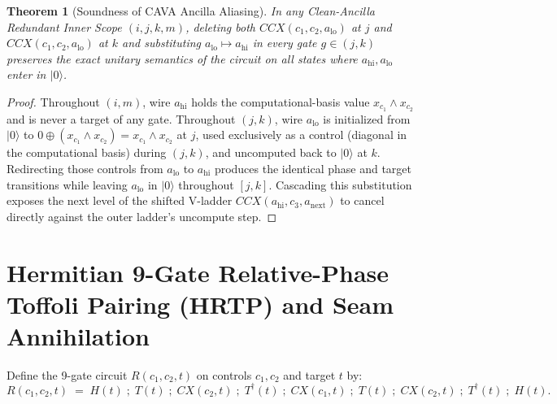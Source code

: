 \documentclass[11pt,a4paper]{article}
\newtheorem{theorem}{Theorem}[section]
\theoremstyle{definition}
\begin{document}
\begin{theorem}[Soundness of \textsc{CAVA} Ancilla Aliasing]
\label{thm:cava}
In any Clean-Ancilla Redundant Inner Scope $(i, j, k, m)$, deleting both $\mathit{CCX}(c_1, c_2, a_{\mathrm{lo}})$ at $j$ and $\mathit{CCX}(c_1, c_2, a_{\mathrm{lo}})$ at $k$ and substituting $a_{\mathrm{lo}} \mapsto a_{\mathrm{hi}}$ in every gate $g \in (j, k)$ preserves the exact unitary semantics of the circuit on all states where $a_{\mathrm{hi}}, a_{\mathrm{lo}}$ enter in $|0\rangle$.
\end{theorem}
\begin{proof}
Throughout $(i, m)$, wire $a_{\mathrm{hi}}$ holds the computational-basis value $x_{c_1} \land x_{c_2}$ and is never a target of any gate. Throughout $(j, k)$, wire $a_{\mathrm{lo}}$ is initialized from $|0\rangle$ to $0 \oplus (x_{c_1} \land x_{c_2}) = x_{c_1} \land x_{c_2}$ at $j$, used exclusively as a control (diagonal in the computational basis) during $(j, k)$, and uncomputed back to $|0\rangle$ at $k$. Redirecting those controls from $a_{\mathrm{lo}}$ to $a_{\mathrm{hi}}$ produces the identical phase and target transitions while leaving $a_{\mathrm{lo}}$ in $|0\rangle$ throughout $[j, k]$. Cascading this substitution exposes the next level of the shifted V-ladder $\mathit{CCX}(a_{\mathrm{hi}}, c_3, a_{\mathrm{next}})$ to cancel directly against the outer ladder's uncompute step.
\end{proof}

\section{Hermitian 9-Gate Relative-Phase Toffoli Pairing (\textsc{HRTP}) and Seam Annihilation}
\label{sec:hrtp}

Define the 9-gate circuit $R(c_1, c_2, t)$ on controls $c_1, c_2$ and target $t$ by:
\[
  R(c_1, c_2, t) \;=\; H(t) \;;\; T(t) \;;\; \mathit{CX}(c_2, t) \;;\; T^\dagger(t) \;;\; \mathit{CX}(c_1, t) \;;\; T(t) \;;\; \mathit{CX}(c_2, t) \;;\; T^\dagger(t) \;;\; H(t).
\]
\end{document}
